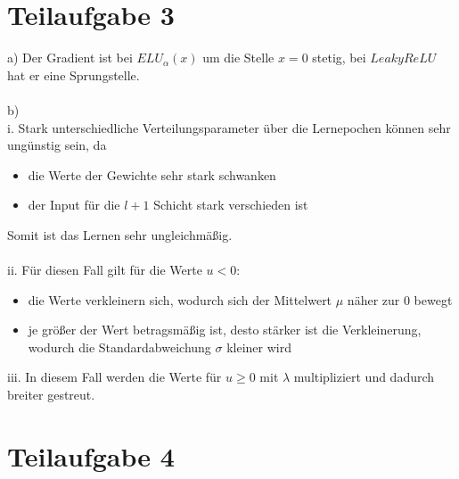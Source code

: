 \documentclass[a4paper, 11pt]{article}
\begin{document}
\section*{Teilaufgabe 3}

a) Der Gradient ist bei $ELU_{\alpha}(x)$ um die Stelle $x = 0$ stetig, bei $LeakyReLU$ hat er eine Sprungstelle.\\
\\
b)\\
i. Stark unterschiedliche Verteilungsparameter über die Lernepochen können sehr ungünstig sein, da
\begin{itemize}
	\item die Werte der Gewichte sehr stark schwanken
	\item der Input für die $l + 1$ Schicht stark verschieden ist
\end{itemize}
Somit ist das Lernen sehr ungleichmäßig.\\
\\
ii. Für diesen Fall gilt für die Werte $u <0$:
\begin{itemize}
	\item die Werte verkleinern sich, wodurch sich der Mittelwert $\mu$ näher zur 0 bewegt
	\item je größer der Wert betragsmäßig ist, desto stärker ist die Verkleinerung, wodurch die Standardabweichung $\sigma$ kleiner wird
\end{itemize}

\noindent iii. In diesem Fall werden die Werte für $u \geq 0$ mit $\lambda$ multipliziert und dadurch breiter gestreut.

\section{Teilaufgabe 4}
\end{document}

